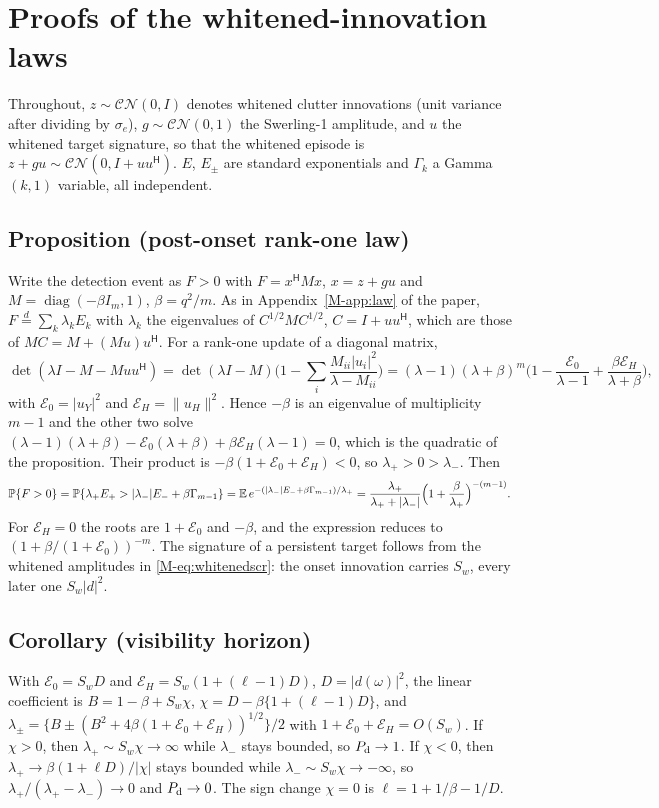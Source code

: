 \section{Proofs of the whitened-innovation laws}\label{sup:r12proofs}
Throughout, $z\sim\mathcal{CN}(0,I)$ denotes whitened clutter innovations (unit variance after dividing by $\sigma_e$), $g\sim\mathcal{CN}(0,1)$ the Swerling-1 amplitude, and $u$ the whitened target signature, so that the whitened episode is $z+gu\sim\mathcal{CN}(0,I+uu^{\mathsf H})$. $E$, $E_\pm$ are standard exponentials and $\Gamma_k$ a Gamma$(k,1)$ variable, all independent.

\subsection{Proposition (post-onset rank-one law)}
Write the detection event as $F>0$ with $F=x^{\mathsf H}Mx$, $x=z+gu$ and $M=\operatorname{diag}(-\beta I_m,1)$, $\beta=q^2/m$. As in Appendix~\ref{M-app:law} of the paper, $F\overset{d}{=}\sum_k\lambda_kE_k$ with $\lambda_k$ the eigenvalues of $C^{1/2}MC^{1/2}$, $C=I+uu^{\mathsf H}$, which are those of $MC=M+(Mu)u^{\mathsf H}$. For a rank-one update of a diagonal matrix,
\[
\det(\lambda I-M-Muu^{\mathsf H})=\det(\lambda I-M)\Big(1-\sum_i\frac{M_{ii}|u_i|^2}{\lambda-M_{ii}}\Big)=(\lambda-1)(\lambda+\beta)^m\Big(1-\frac{\mathcal E_0}{\lambda-1}+\frac{\beta \mathcal E_H}{\lambda+\beta}\Big),
\]
with $\mathcal E_0=|u_Y|^2$ and $\mathcal E_H=\|u_H\|^2$. Hence $-\beta$ is an eigenvalue of multiplicity $m-1$ and the other two solve $(\lambda-1)(\lambda+\beta)-\mathcal E_0(\lambda+\beta)+\beta\mathcal E_H(\lambda-1)=0$, which is the quadratic of the proposition. Their product is $-\beta(1+\mathcal E_0+\mathcal E_H)<0$, so $\lambda_+>0>\lambda_-$. Then
\[
\mathbb{P}\{F>0\}=\mathbb{P}\{\lambda_+E_+>|\lambda_-|E_-+\beta\Gamma_{m-1}\}=\mathbb E\,e^{-(|\lambda_-|E_-+\beta\Gamma_{m-1})/\lambda_+}=\frac{\lambda_+}{\lambda_++|\lambda_-|}\Big(1+\frac{\beta}{\lambda_+}\Big)^{-(m-1)}.
\]
For $\mathcal E_H=0$ the roots are $1+\mathcal E_0$ and $-\beta$, and the expression reduces to $(1+\beta/(1+\mathcal E_0))^{-m}$. The signature of a persistent target follows from the whitened amplitudes in \eqref{M-eq:whitenedscr}: the onset innovation carries $S_w$, every later one $S_w|d|^2$.

\subsection{Corollary (visibility horizon)}
With $\mathcal E_0=S_wD$ and $\mathcal E_H=S_w(1+(\ell-1)D)$, $D=|d(\omega)|^2$, the linear coefficient is $B=1-\beta+S_w\chi$, $\chi=D-\beta\{1+(\ell-1)D\}$, and $\lambda_\pm=\{B\pm(B^2+4\beta(1+\mathcal E_0+\mathcal E_H))^{1/2}\}/2$ with $1+\mathcal E_0+\mathcal E_H=O(S_w)$. If $\chi>0$, then $\lambda_+\sim S_w\chi\to\infty$ while $\lambda_-$ stays bounded, so $P_{\rm d}\to1$. If $\chi<0$, then $\lambda_+\to\beta(1+\ell D)/|\chi|$ stays bounded while $\lambda_-\sim S_w\chi\to-\infty$, so $\lambda_+/(\lambda_+-\lambda_-)\to0$ and $P_{\rm d}\to0$. The sign change $\chi=0$ is $\ell=1+1/\beta-1/D$.

